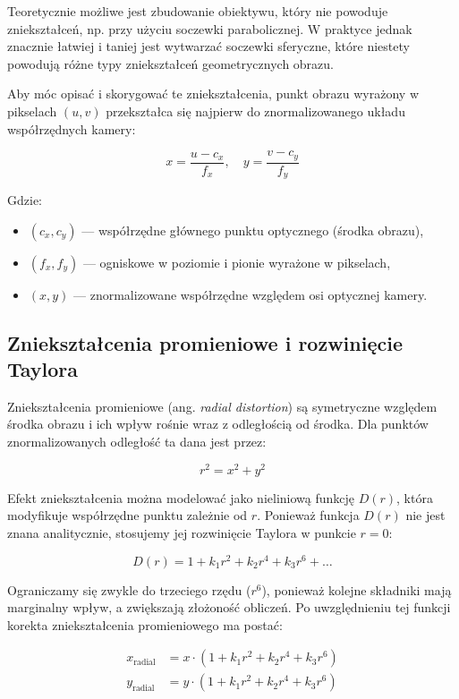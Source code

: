 \documentclass[magisterska]{pracadypl}
\begin{document}
Teoretycznie możliwe jest zbudowanie obiektywu, który nie powoduje zniekształceń, np. przy użyciu soczewki parabolicznej. W praktyce jednak znacznie łatwiej i taniej jest wytwarzać soczewki sferyczne, które niestety powodują różne typy zniekształceń geometrycznych obrazu.

Aby móc opisać i skorygować te zniekształcenia, punkt obrazu wyrażony w pikselach \( (u, v) \) przekształca się najpierw do znormalizowanego układu współrzędnych kamery:

\[
x = \frac{u - c_x}{f_x}, \quad y = \frac{v - c_y}{f_y}
\]

Gdzie:
\begin{itemize}
    \item \( (c_x, c_y) \) — współrzędne głównego punktu optycznego (środka obrazu),
    \item \( (f_x, f_y) \) — ogniskowe w poziomie i pionie wyrażone w pikselach,
    \item \( (x, y) \) — znormalizowane współrzędne względem osi optycznej kamery.
\end{itemize}

\subsection*{Zniekształcenia promieniowe i rozwinięcie Taylora}

Zniekształcenia promieniowe (ang. \emph{radial distortion}) są symetryczne względem środka obrazu i ich wpływ rośnie wraz z odległością od środka. Dla punktów znormalizowanych odległość ta dana jest przez:

\[
r^2 = x^2 + y^2
\]

Efekt zniekształcenia można modelować jako nieliniową funkcję \( D(r) \), która modyfikuje współrzędne punktu zależnie od \( r \). Ponieważ funkcja \( D(r) \) nie jest znana analitycznie, stosujemy jej rozwinięcie Taylora w punkcie \( r = 0 \):

\[
D(r) = 1 + k_1 r^2 + k_2 r^4 + k_3 r^6 + \ldots
\]

Ograniczamy się zwykle do trzeciego rzędu (\( r^6 \)), ponieważ kolejne składniki mają marginalny wpływ, a zwiększają złożoność obliczeń. Po uwzględnieniu tej funkcji korekta zniekształcenia promieniowego ma postać:

\begin{align*}
x_{\text{radial}} &= x \cdot \left(1 + k_1 r^2 + k_2 r^4 + k_3 r^6 \right) \\
y_{\text{radial}} &= y \cdot \left(1 + k_1 r^2 + k_2 r^4 + k_3 r^6 \right)
\end{align*}
\end{document}
